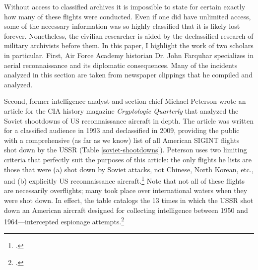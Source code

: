 \documentclass[14pt]{extarticle}
\begin{document}
Without access to classified archives it is impossible to state for certain exactly how many of these flights were conducted. Even if one did have unlimited access, some of the necessary information was so highly classified that it is likely lost forever. Nonetheless, the civilian researcher is aided by the declassified research of military archivists before them. In this paper, I highlight the work of two scholars in particular. First, Air Force Academy historian Dr. John Farquhar specializes in aerial reconnaissance and its diplomatic consequences. Many of the incidents analyzed in this section are taken from newspaper clippings that he compiled and analyzed.

Second, former intelligence analyst and section chief Michael Peterson wrote an article for the CIA history magazine \emph{Cryptologic Quarterly} that analyzed the Soviet shootdowns of US reconnaissance aircraft in depth. The article was written for a classified audience in 1993 and declassified in 2009, providing the public with a comprehensive (as far as we know) list of all American SIGINT flights shot down by the USSR (Table \ref{soviet-shootdowns}). Peterson uses two limiting criteria that perfectly suit the purposes of this article: the only flights he lists are those that were (a) shot down by Soviet attacks, not Chinese, North Korean, etc., and (b) explicitly US reconnaissance aircraft.\footcite[p.~4]{peterson_maybe_1993} Note that not all of these flights are necessarily overflights; many took place over international waters when they were shot down. In effect, the table catalogs the 13 times in which the USSR shot down an American aircraft designed for collecting intelligence between 1950 and 1964---intercepted espionage attempts.\footcite[p.~5. In the original document, this table lists the first incident as having taken place over the Barents Sea, not the Baltic Sea. Because the description of the mission---including a map of its route in the same document---takes place entirely over the Baltic sea, I have concluded that this has to be a typographical error, and corrected it here.]{peterson_maybe_1993}
\end{document}

